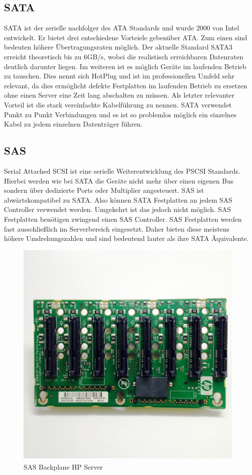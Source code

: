 \documentclass[a4paper, DIV20, 12pt, headsepline, parskip, flushleft]{scrartcl}
\begin{document}
\subsection{SATA}
SATA ist der serielle nachfolger des ATA Standards und wurde 2000 von Intel entwickelt. Er bietet drei entschiedene Vorteiele gebenüber ATA. Zum einen sind bedeuten höhere Übertragungsraten möglich. Der aktuelle Standard SATA3 erreicht theoretisch bis zu 6GB/s, wobei die realistisch erreichbaren Datenraten deutlich darunter liegen. 
Im weiteren ist es möglich Geräte im laufenden Betrieb zu tauschen. Dies nennt sich HotPlug und ist im professionellen Umfeld sehr relevant, da dies ermöglicht defekte Festplatten im laufenden Betrieb zu ersetzen ohne einen Server eine Zeit lang abschalten zu müssen. 
Als letzter relevanter Vorteil ist die stark vereinfachte Kabelführung zu nennen. SATA verwendet Punkt zu Punkt Verbindungen und es ist so problemlos möglich ein einzelnes Kabel zu jedem einzelnen Datenträger führen. 
\subsection{SAS}
Serial Attached SCSI ist eine serielle Weiterentwicklung des PSCSI Standards. Hierbei werden wie bei SATA die Geräte nicht mehr über einen eigenen Bus sondern über dedizierte Ports oder Multiplier angesteuert.
SAS ist abwärtskompatibel zu SATA. Also können SATA Festplatten an jedem SAS Controller verwendet werden. Umgekehrt ist das jedoch nicht möglich. SAS Festplatten benötigen zwingend einen SAS Controller.\newline
SAS Festplatten werden fast ausschließlich im Serverbereich eingesetzt. Daher bieten diese meistens höhere Umdrehungszahlen und sind bedeutend lauter als ihre SATA Äquivalente. 
\begin{figure}[H]
\begin{center}
\includegraphics[scale=0.15]{sasbackplane.jpg}
\end{center}
\caption{SAS Backplane HP Server \textsuperscript{\cite{img:sas}}}
\end{figure} 
\end{document}
